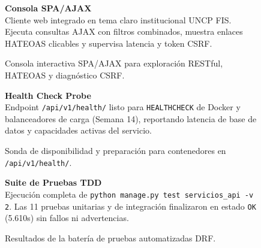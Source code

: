 \documentclass[10pt,a4paper]{article}
\begin{document}
\begin{figure}[H]
\centering
\begin{minipage}[c]{0.73\textwidth}
    \centering
\end{minipage}\hfill
\begin{minipage}[c]{0.24\textwidth}
    \raggedright
    \textbf{\color{uncpnavy}\small Consola SPA/AJAX}\\[4pt]
    \footnotesize
    \color{uncpdark}
    Cliente web integrado en tema claro institucional UNCP FIS. Ejecuta consultas AJAX con filtros combinados, muestra enlaces HATEOAS clicables y supervisa latencia y token CSRF.
\end{minipage}
\vspace{-0.2cm}
\caption{Consola interactiva SPA/AJAX para exploración RESTful, HATEOAS y diagnóstico CSRF.}
\label{fig:interfaz_spa}
\end{figure}

\begin{figure}[H]
\centering
\begin{minipage}[c]{0.73\textwidth}
    \centering
\end{minipage}\hfill
\begin{minipage}[c]{0.24\textwidth}
    \raggedright
    \textbf{\color{uncpnavy}\small Health Check Probe}\\[4pt]
    \footnotesize
    \color{uncpdark}
    Endpoint \texttt{/api/v1/health/} listo para \texttt{HEALTHCHECK} de Docker y balanceadores de carga (Semana 14), reportando latencia de base de datos y capacidades activas del servicio.
\end{minipage}
\vspace{-0.2cm}
\caption{Sonda de disponibilidad y preparación para contenedores en \texttt{/api/v1/health/}.}
\label{fig:interfaz_health}
\end{figure}

\begin{figure}[H]
\centering
\begin{minipage}[c]{0.73\textwidth}
    \centering
\end{minipage}\hfill
\begin{minipage}[c]{0.24\textwidth}
    \raggedright
    \textbf{\color{uncpnavy}\small Suite de Pruebas TDD}\\[4pt]
    \footnotesize
    \color{uncpdark}
    Ejecución completa de \texttt{python manage.py test servicios\_api -v 2}. Las 11 pruebas unitarias y de integración finalizaron en estado \texttt{OK} (5.610s) sin fallos ni advertencias.
\end{minipage}
\vspace{-0.2cm}
\caption{Resultados de la batería de pruebas automatizadas DRF.}
\label{fig:term_tests}
\end{figure}
\end{document}
